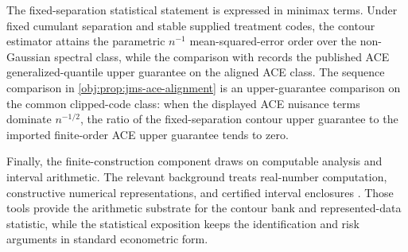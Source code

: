 The fixed-separation statistical statement is expressed in minimax terms. Under fixed cumulant separation and stable supplied treatment codes, the contour estimator attains the parametric \(n^{-1}\) mean-squared-error order over the non-Gaussian spectral class, while the comparison with \citet{JinMackeySyrgkanis2025} records the published ACE generalized-quantile upper guarantee on the aligned ACE class. The sequence comparison in \cref{obj:prop:jms-ace-alignment} is an upper-guarantee comparison on the common clipped-code class: when the displayed ACE nuisance terms dominate \(n^{-1/2}\), the ratio of the fixed-separation contour upper guarantee to the imported finite-order ACE upper guarantee tends to zero.

Finally, the finite-construction component draws on computable analysis and interval arithmetic. The relevant background treats real-number computation, constructive numerical representations, and certified interval enclosures \citep{Weihrauch2000,Ko1991,Moore1966}. Those tools provide the arithmetic substrate for the contour bank and represented-data statistic, while the statistical exposition keeps the identification and risk arguments in standard econometric form.
